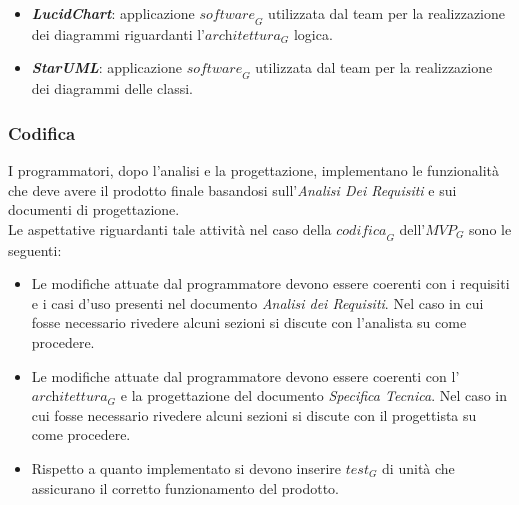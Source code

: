 \begin{itemize}
    \item \emph{\textbf{LucidChart}}: applicazione $\textit{software}_G$ utilizzata dal team per la realizzazione dei diagrammi riguardanti l'$\textit{architettura}_G$ logica.
    \item \emph{\textbf{StarUML}}: applicazione $\textit{software}_G$ utilizzata dal team per la realizzazione dei diagrammi delle classi.
\end{itemize}








\subsubsection{Codifica}
I programmatori, dopo l'analisi e la progettazione, implementano le funzionalità che deve avere il prodotto finale basandosi sull'\textit{Analisi Dei Requisiti} e sui documenti di progettazione.\\
Le aspettative riguardanti tale attività nel caso della $\textit{codifica}_G$ dell'$\textit{MVP}_G$ sono le seguenti:
\begin{itemize}
    \item  Le modifiche attuate dal programmatore devono essere coerenti con i requisiti e i casi d'uso presenti nel documento \textit{Analisi dei Requisiti}.
    Nel caso in cui fosse necessario rivedere alcuni sezioni si discute con l'analista su come procedere.
    \item Le modifiche attuate dal programmatore devono essere coerenti con l'$\textit{architettura}_G$ e la progettazione del documento \textit{Specifica Tecnica}. Nel caso in cui fosse necessario rivedere alcuni sezioni si discute con il progettista su come procedere.
    \item Rispetto a quanto implementato si devono inserire $\textit{test}_G$ di unità che assicurano il corretto funzionamento del prodotto.
\end{itemize}

